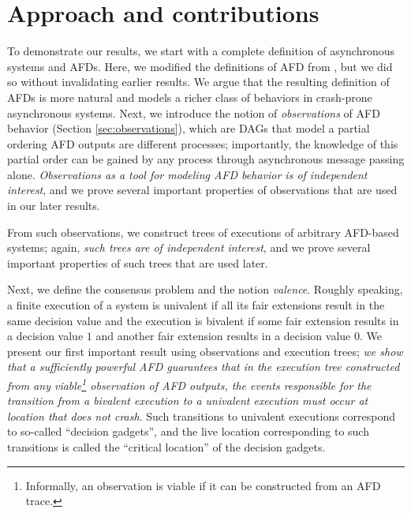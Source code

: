 \documentclass[11pt]{article}
\numberwithin{theorem}{section}
\begin{document}
\section{Approach and contributions}\label{sec:approachAndContributions}
To demonstrate our results, we start with a complete definition of asynchronous systems and AFDs. Here, we modified the definitions of AFD from \cite{cornejoetalAFD,cornejoetalAFD-TR}, but we did so without invalidating earlier results. We argue that the resulting definition of AFDs is more natural and models a richer class of behaviors in crash-prone asynchronous systems. Next, we introduce the notion of \emph{observations} of AFD behavior (Section \ref{sec:observations}), which are DAGs that model a partial ordering AFD outputs are different processes; importantly, the knowledge of this partial order can be gained by any process through asynchronous message passing alone. \emph{Observations as a tool for modeling AFD behavior is of independent interest}, and we prove several important properties of observations that are used in our later results.

From such observations, we construct trees of executions of arbitrary AFD-based systems; again, \emph{such trees are of independent interest}, and we prove several important properties of such trees that are used later.

Next, we define the consensus problem and the notion \emph{valence}. Roughly speaking, a finite execution of a system is univalent if all its fair extensions result in the same decision value and the execution is bivalent if some fair extension results in a decision value $1$ and another fair extension results in a decision value $0$. We present our first important result using observations and execution trees; \emph{we show that a sufficiently powerful AFD guarantees that in the execution tree constructed from any viable\footnote{Informally, an observation is viable if it can be constructed from an AFD trace.} observation of AFD outputs, the events responsible for the transition from a bivalent execution to a univalent execution must occur at location that does not crash}. Such transitions to univalent executions correspond to so-called ``decision gadgets'', and the live location corresponding to such transitions is called the ``critical location'' of the decision gadgets.
\end{document}
